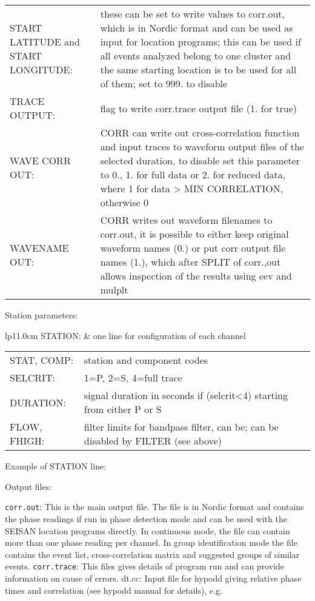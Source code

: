 \begin{tabular}{lp{8.0cm}}
START LATITUDE and START LONGITUDE: & these can be set to write values to corr.out, which is in 
Nordic format and can be used as input for location programs; this can be used if all events analyzed belong to one cluster and the same starting location is to be used for all of them; set to 999. to disable \\
TRACE OUTPUT: & flag to write corr.trace output file (1. for true) \\
WAVE CORR OUT: & CORR can write out cross-correlation function and input traces to waveform output files of the selected duration, to disable set this parameter to 0., 1. for full data or 2. for reduced data, where 1 for data > MIN CORRELATION, otherwise 0 \\
WAVENAME OUT: & CORR writes out waveform filenames to corr.out, it is possible to either keep original waveform names (0.) or put corr output file names (1.), which after SPLIT of corr.,out allows inspection of the results using eev and mulplt  \\
\end{tabular}

Station parameters: 

\begin{tabular}{lp{11.0cm}}
STATION: & one line for configuration of each channel 
\begin{tabular}{lp{7.0cm}}
STAT, COMP: & station and component codes \\
SELCRIT: & 1=P, 2=S, 4=full trace \\
DURATION: & signal duration in seconds if (selcrit<4) starting from either P or S \\
FLOW, FHIGH: & filter limits for bandpass filter, can be; can be disabled by FILTER (see above)  \\
\end{tabular}
\end{tabular}

Example of STATION line: 



Output files: 

\texttt{corr.out}: This is the main output file. The file is in Nordic format and contains the phase readings if run in phase detection mode and can be used with the SEISAN location programs directly. In continuous mode, the file can contain more than one phase reading per channel. In group identification mode the file contains the event list, cross-correlation matrix and suggested groups of similar events. \newline
\texttt{corr.trace}: This files gives details of program run and can provide information on cause of errors. dt.cc: Input file for hypodd giving relative phase times and correlation (see hypodd manual for details), 
e.g. \newline


